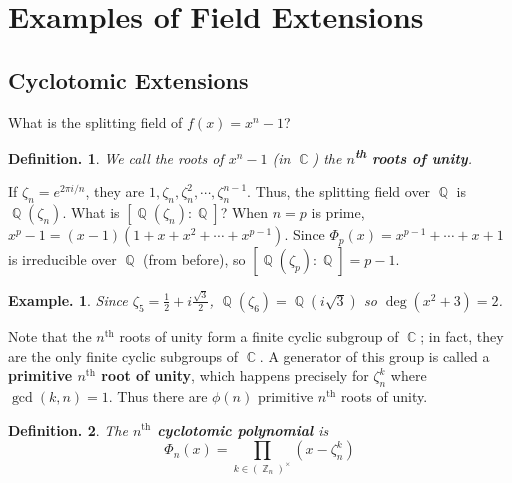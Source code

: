 \documentclass[11pt, a4paper]{memoir}
\DeclareMathOperator{\Q}{{\mathbb{Q}}}
\DeclareMathOperator{\Z}{{\mathbb{Z}}}
\DeclareMathOperator{\C}{{\mathbb{C}}}
\newcommand{\mbf}[1]{{\boldmath\bfseries #1}}
\theoremstyle{change}
\newtheorem{lemma}[theorem]{Lemma.}
\newtheorem{proposition}[theorem]{Proposition.}
\theoremstyle{plain}
\theoremstyle{nonumberplain}
\newtheorem{definition}{Definition.}
\newtheorem{example}{Example.}
\newtheorem{remark}{Remark.}
\newtheorem{proof}{Proof}
\numberwithin{equation}{section}
\begin{document}
\section{Examples of Field Extensions}
\subsection{Cyclotomic Extensions}
What is the splitting field of $f(x)=x^n-1$?
\begin{definition}
    We call the roots of $x^n-1$ (in $\C$) the \mbf{$n$\textsuperscript{th} roots of unity}.
\end{definition}
If $\zeta_n=e^{2\pi i/n}$, they are $1,\zeta_n,\zeta_n^2,\cdots,\zeta_n^{n-1}$.
Thus, the splitting field over $\Q$ is $\Q(\zeta_n)$.
What is $[\Q(\zeta_n):\Q]$?
When $n=p$ is prime, $x^p-1=(x-1)(1+x+x^2+\cdots+x^{p-1})$.
Since $\Phi_p(x)=x^{p-1}+\cdots+x+1$ is irreducible over $\Q$ (from before), so $[\Q(\zeta_p):\Q]=p-1$.
\begin{example}
    Since $\zeta_5=\frac{1}{2}+i\frac{\sqrt{3}}{2}$, $\Q(\zeta_6)=\Q(i\sqrt{3})$ so $\deg(x^2+3)=2$.
\end{example}
Note that the $n^\text{th}$ roots of unity form a finite cyclic subgroup of $\C$; in fact, they are the only finite cyclic subgroups of $\C$.
A generator of this group is called a \mbf{primitive $n^\text{th}$ root of unity}, which happens precisely for $\zeta_n^k$ where $\gcd(k,n)=1$.
Thus there are $\phi(n)$ primitive $n^\text{th}$ roots of unity.
\begin{definition}
    The \mbf{$n^\text{th}$ cyclotomic polynomial} is
    \begin{equation*}
        \Phi_n(x)=\prod\limits_{k\in(\Z_n)^\times}(x-\zeta_n^k)
    \end{equation*}
\end{definition}
\end{document}
